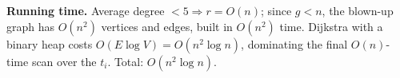 \documentclass[12pt,twoside]{article}
\begin{document}
\begin{problems}
\textbf{Running time.} Average degree $<5 \Rightarrow r=O(n)$; since $g<n$,
the blown-up graph has $O(n^2)$ vertices and edges, built in $O(n^2)$ time.
Dijkstra with a binary heap costs $O(E\log V)=O(n^2\log n)$, dominating the
final $O(n)$-time scan over the $t_i$. Total: $O(n^2\log n)$.

\end{problems}
\end{document}
